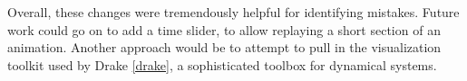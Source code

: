 \documentclass[main.tex]{subfiles}
\begin{document}

Overall, these changes were tremendously helpful for identifying mistakes.
Future work could go on to add a time slider, to allow replaying a short section of an animation. Another approach would be to attempt to pull in the visualization toolkit used by Drake \cref{drake}, a sophisticated toolbox for dynamical systems.

\end{document}
